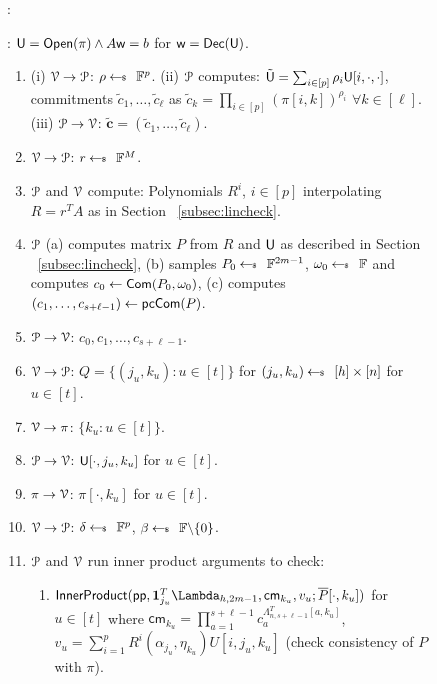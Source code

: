 \begin{figure}[h!]
	{\footnotesize
		\begin{framed}
			:
			
			: $\ewit=\open(\pi)\wedge A\wit=b$ for $\wit=\dec(\ewit)$.
			
			\begin{enumerate}[{\rm 1.}]
				\item (i) $\verifier\rightarrow\prover$: $\rho\sample \FF^p$. (ii) $\prover$ computes: $\tilde{\ewit}=\sum_{i\in [p]}\rho_i\ewit[i,\cdot,\cdot]$, commitments $\tilde{c}_1,\ldots,\tilde{c}_\ell$ as $\tilde{c}_k = \prod_{i\in[p]}(\pi[i,k])^{\rho_i}$ $\forall k\in[\ell]$. (iii) $\prover\rightarrow\verifier$: $\tilde{\bm{c}}=(\tilde{c}_1,\ldots,\tilde{c}_\ell)$.
				\item $\verifier\rightarrow\prover$: $r\sample \FF^M$.
				\item $\prover$ and $\verifier$ compute: Polynomials $R^i$, $i\in [p]$ interpolating $R=r^TA$ as in Section ~\ref{subsec:lincheck}.
				\item $\prover$ (a) computes matrix $P$ from $R$ and $\ewit$ as described in Section ~\ref{subsec:lincheck}, (b) samples $P_0\sample \FF^{2m-1}$, $\omega_0\sample \FF$ and computes $c_0\gets \comm(P_0,\omega_0)$, (c) computes $(c_1,\ldots,c_{s+\ell-1}) \gets \pccom(P)$.
				\item $\prover\rightarrow\verifier$: $c_0,c_1,\ldots,c_{s+\ell-1}$.
				\item $\verifier\rightarrow\prover$: $Q=\{(j_u,k_u):u\in [t]\}$ for $(j_u,k_u)\sample [h]\times [n]$ for $u\in [t]$.
				\item $\verifier\rightarrow\pi$: $\{k_u:u\in [t]\}$.
				\item $\prover\rightarrow\verifier$: $\ewit[\cdot,j_u,k_u]$ for $u\in [t]$.
				\item $\pi\rightarrow\verifier$: $\pi[\cdot,k_u]$ for $u\in [t]$.
				\item $\verifier\rightarrow\prover$: $\delta\sample \FF^p$, $\beta\sample \FF\backslash \{0\}$.
				\item $\prover$ and $\verifier$ run inner product arguments to check:
				\begin{enumerate}
					\item $\innerproduct(\mathsf{pp},\bm{1}_{j_u}^T\Lambda_{h,2m-1},\mathsf{cm}_{k_u},v_u;\overline{P}[\cdot,k_u])$ for $u\in [t]$ where $\mathsf{cm}_{k_u}=\prod_{a=1}^{s+\ell-1}c_a^{\Lambda^T_{n,s+\ell-1}[a,k_u]}$, $v_u=\sum_{i=1}^pR^i(\alpha_{j_u},\eta_{k_u})U[i,j_u,k_u]$ (check consistency of $P$ with $\pi$).

\end{enumerate}
\end{enumerate}
\end{framed}}
\end{figure}
